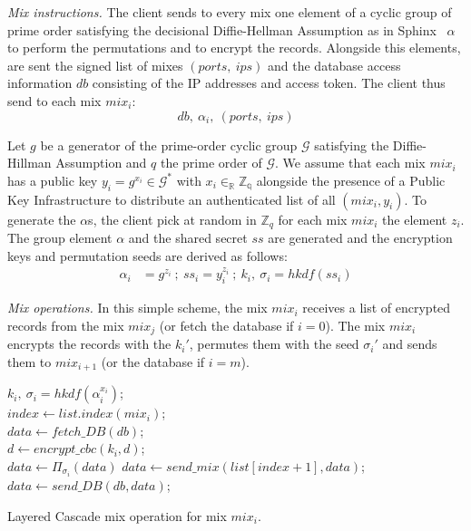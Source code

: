 \documentclass[USenglish,oneside,twocolumn]{article}
\begin{document}
\noindent\textit{Mix instructions.}
The client sends to every mix one element of a cyclic group of prime order satisfying the decisional Diffie-Hellman Assumption as in Sphinx~\cite{danezis2009sphinx} $\alpha$ to perform the permutations and to encrypt the records. Alongside this elements, are sent the signed list of mixes $(ports,\ ips)$ and the database access information $db$ consisting of the IP addresses and access token. The client thus send to each mix $mix_i$:
$$ db,\ \alpha_{i},\ (ports,\ ips) $$

Let $g$ be a generator of the prime-order cyclic group $\mathcal{G}$ satisfying the Diffie-Hillman Assumption and $q$ the prime order of $\mathcal{G}$. We assume that each mix $mix_i$ has a public key $y_i=g^{x_i}\in \mathcal{G}^*$ with $x_i \in_{\mathbb{R}} \mathbb{Z_q}$ alongside the presence of a Public Key Infrastructure to distribute an authenticated list of all $(mix_i, y_i)$.
To generate the $\alpha$s, the client pick at random in $\mathbb{Z}_q$ for each mix $mix_i$ the element $z_i$. The group element $\alpha$ and the shared secret $ss$ are generated and the encryption keys and permutation seeds are derived as follows:
\begin{align*}
\alpha_i &= g^{z_i}\ ;\ ss_i = y_i^{z_i}\ ;\ k_i,\ \sigma_i=hkdf(ss_i)
\end{align*}

\noindent\textit{Mix operations.} In this simple scheme, the mix $mix_i$ receives a list of encrypted records from the mix $mix_j$ (or fetch the database if $i=0$). The mix $mix_i$ encrypts the records with the $k_i'$, permutes them with the seed $\sigma_{i}'$ and sends them to $mix_{i+1}$ (or the database if $i=m$).\\

\begin{algorithm}
\DontPrintSemicolon
{}
$k_i,\ \sigma_{i}=hkdf(\alpha_{i}^{x_i})$;\\
$index \gets list.index(mix_i)$;\\
{
$data \gets fetch\_DB(db)$;\\
}
{
	$d \gets encrypt\_cbc(k_i, d)$;\\
}
$data \gets \Pi_{\sigma_i}(data)$
{
$data \gets send\_mix(list[index+1], data)$;\\
}
\Else
{
$data \gets send\_DB(db, data)$;\\
}
\caption{Layered Cascade mix operation for mix $mix_i$.}
\label{alg:CL}
\end{algorithm}
\end{document}
